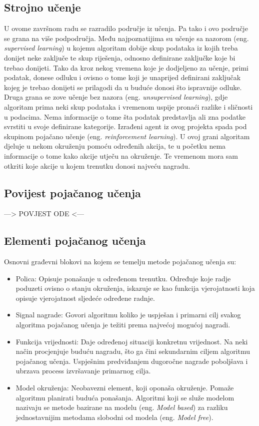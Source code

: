 \subsection{Strojno učenje}
U ovome završnom radu se razradilo područje iz učenja. Pa tako i ovo područje se grana na više podpodručja. Među najpoznatijima su učenje sa nazorom (eng. \textit{supervised learning}) u kojemu algoritam dobije skup podataka iz kojih treba donijet neke zaključe te skup riješenja, odnosno definirane zaključke koje bi trebao donijeti. Tako da kroz nekog vremena koje je dodjeljeno za učenje, primi podatak, donese odluku i ovisno 
o tome koji je unaprijed definirani zaključak kojeg je trebao donijeti se prilagodi da u buduće donosi što ispravnije odluke. Druga grana se zove učenje bez nazora (eng. \textit{unsupervised learning}), gdje algoritam prima neki skup podataka i vremenom uspije pronaći razlike i sličnosti u podacima. Nema informacije o tome šta podatak predstavlja ali zna podatke svrstiti u svoje definirane kategorije. Izrađeni agent iz ovog projekta spada pod skupinom pojačano učenje (eng. \textit{reinforcement learning}). U ovoj grani algoritam djeluje u nekom okruženju pomoću određenih akcija, te u početku nema informacije o tome kako akcije utječu na okruženje. Te vremenom mora sam otkriti koje akcije u kojem trenutku donosi najveću nagradu.


\subsection{Povijest pojačanog učenja}
---> POVJEST ODE <---

\subsection{Elementi pojačanog učenja}
Osnovni građevni blokovi na kojem se temelju metode pojačanog učenja su:
\begin{itemize}
	\item Polica: Opisuje ponašanje u određenom trenutku. Određuje koje radje poduzeti ovisno o stanju okruženja, iskazuje se kao funkcija vjerojatnosti koja opisuje vjerojatnost sljedeće određene radnje.
	
	\item Signal nagrade: Govori algoritmu koliko je uspješan i primarni cilj svakog algoritma pojačanog učenja je težiti prema najvećoj mogućoj nagradi. 
	
	\item Funkcija vrijednosti: Daje određenoj situaciji konkretnu vrijednost. Na neki način procjenjuje buduću nagradu, što ga čini sekundarnim ciljem algoritmu pojačanog učenja. Uspješnim predviđanjem dugoročne nagrade poboljšava i ubrzava process izvršavanje primarnog cilja. 
	
	\item Model okruženja: Neobavezni element, koji oponaša okruženje. Pomaže algoritmu planirati buduća ponašanja. Algoritmi koji se služe modelom nazivaju se metode bazirane na modelu (eng. \textit{Model based}) za razliku jednostavnijim metodama slobodni od modela (eng. \textit{Model free}).
\end{itemize}

